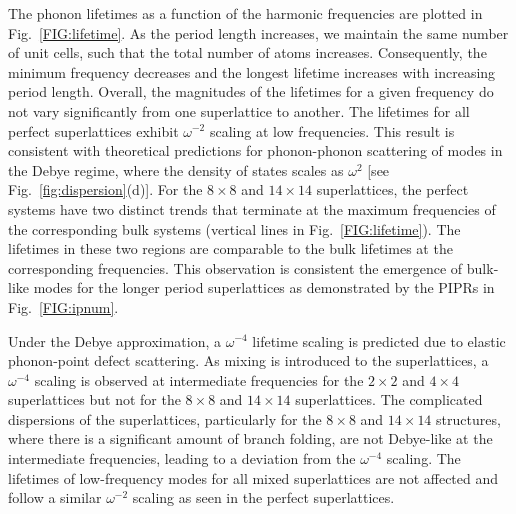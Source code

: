 \documentclass[aps,prb,preprint,preprintnumbers,amsmath,amssymb,floatfix,superscriptaddress]{revtex4}
\begin{document}
The phonon lifetimes as a function of the harmonic frequencies are plotted in Fig.~\ref{FIG:lifetime}. As the period length increases, we maintain the same number of unit cells, such that the total number of atoms increases. Consequently, the minimum frequency decreases and the longest lifetime increases with increasing period length. Overall, the magnitudes of the lifetimes for a given frequency do not vary significantly from one superlattice to another. The lifetimes for all perfect superlattices exhibit $\omega^{-2}$ scaling at low frequencies. This result is consistent with theoretical predictions for phonon-phonon scattering of modes in the Debye regime, where the density of states scales as $\omega^{2}$ [see Fig.~\ref{fig:dispersion}(d)].\cite{Klemens_Thermal_1951} For the $8\times8$ and $14\times14$ superlattices, the perfect systems have two distinct trends that terminate at the maximum frequencies of the corresponding bulk systems (vertical lines in Fig.~\ref{FIG:lifetime}). The lifetimes in these two regions are comparable to the bulk lifetimes at the corresponding frequencies. This observation is consistent the emergence of bulk-like modes for the longer period superlattices as demonstrated by the PIPRs in Fig.~\ref{FIG:ipnum}.

Under the Debye approximation, a $\omega^{-4}$ lifetime scaling is predicted due to elastic phonon-point defect scattering.\cite{PhysRev.140.A1812,klemens_scattering_1955-3, klemens_thermal_1957-2} As mixing is introduced to the superlattices, a $\omega^{-4}$ scaling is observed at intermediate frequencies for the $2\times2$ and $4\times4$ superlattices but not for the $8\times8$ and $14\times14$ superlattices. The complicated dispersions of the superlattices, particularly for the $8\times8$ and $14\times14$ structures, where there is a significant amount of branch folding, are not Debye-like at the intermediate frequencies, leading to a deviation from the $\omega^{-4}$ scaling. The lifetimes of low-frequency modes for all mixed superlattices are not affected and follow a similar $\omega^{-2}$ scaling as seen in the perfect superlattices.
\end{document}
